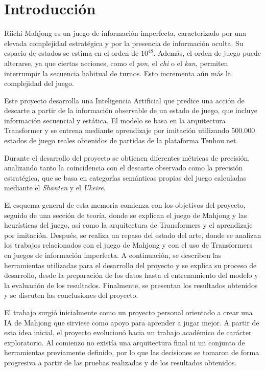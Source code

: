 \section{Introducción}

Riichi Mahjong es un juego de información imperfecta,
caracterizado por una elevada complejidad estratégica y por la presencia de
información oculta. Su espacio de estados se estima en el orden de $10^{48}$\cite{li2020suphx}.
Además, el orden de juego puede alterarse, ya que ciertas acciones, como el
\textit{pon}, el \textit{chi} o el \textit{kan}, permiten interrumpir la secuencia habitual de turnos. Esto incrementa aún más la complejidad del juego.

Este proyecto desarrolla una Inteligencia Artificial que predice una acción de descarte a partir de la información observable de un estado de juego,
que incluye información secuencial y estática. El modelo se basa en la arquitectura Transformer
y se entrena mediante aprendizaje por imitación utilizando 500.000 estados de juego reales
obtenidos de partidas de la plataforma Tenhou.net.

Durante el desarrollo del proyecto se obtienen diferentes métricas de precisión,
analizando tanto la coincidencia con el descarte observado como la precisión estratégica, que se basa en categorías semánticas propias del juego
calculadas mediante el \textit{Shanten} y el \textit{Ukeire}.

El esquema general de esta memoria comienza con
los objetivos del proyecto,
seguido de una sección de teoría, donde se explican
el juego de Mahjong y las heurísticas del juego,
así como la arquitectura de Transformers y el aprendizaje
por imitación.
Después, se realiza un repaso del estado del arte,
donde se analizan los trabajos relacionados con el juego de Mahjong y con el uso de Transformers en juegos de información imperfecta.
A continuación, se describen las herramientas utilizadas para el desarrollo del proyecto
y se explica su proceso de desarrollo, desde la preparación de los datos hasta el
entrenamiento del modelo y la evaluación de los resultados.
Finalmente, se presentan los resultados obtenidos y se discuten las conclusiones del proyecto.

El trabajo surgió inicialmente como un proyecto personal orientado a crear una IA de Mahjong que sirviese como apoyo para aprender a jugar mejor. A partir de esta idea inicial, el proyecto evolucionó hacia un trabajo académico de carácter exploratorio. Al comienzo no existía una arquitectura final ni un conjunto de herramientas previamente definido, por lo que las decisiones se tomaron de forma progresiva a partir de las pruebas realizadas y de los resultados obtenidos.

